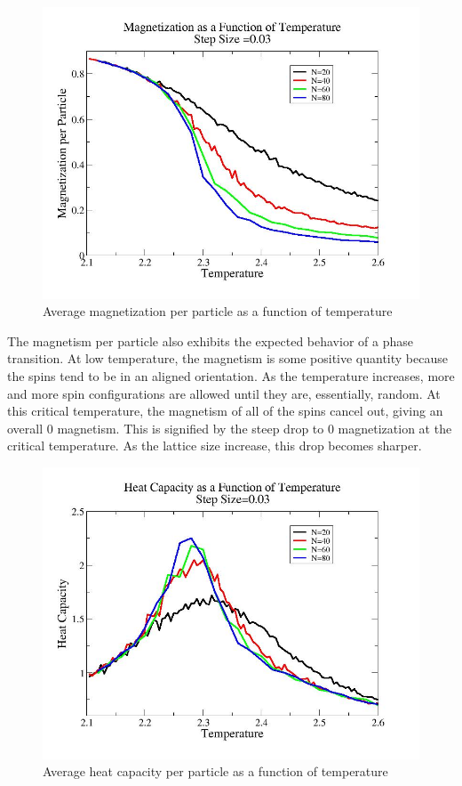 \documentclass[%
oneside,                 %
final,                   %
10pt]{article}
\begin{document}
\begin{figure}[H]\label{fig:looseM}
  \centering
    \includegraphics[width=0.85 \textwidth]{magloose.jpg}
    \caption{Average magnetization per particle as a function of temperature}
\end{figure}

The magnetism per particle also exhibits the expected behavior of a phase transition.  At low temperature, the magnetism is some positive quantity because the spins tend to be in an aligned orientation.  As the temperature increases, more and more spin configurations are allowed until they are, essentially, random.  At this critical temperature, the magnetism of all of the spins cancel out, giving an overall 0 magnetism.  This is signified by the steep drop to 0 magnetization at the critical temperature.  As the lattice size increase, this drop becomes sharper.

\begin{figure}[H]\label{fig:looseC}
  \centering
    \includegraphics[width=1.1 \textwidth]{capacityloose.jpg}
    \caption{Average heat capacity per particle as a function of temperature}
\end{figure}
\end{document}
